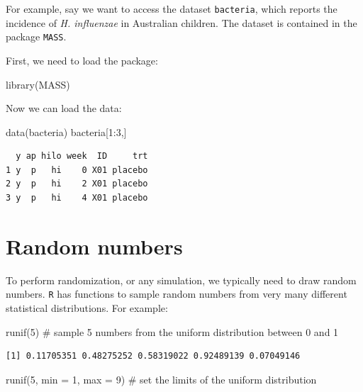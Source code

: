 \documentclass[
  letterpaper,
  DIV=11,
  numbers=noendperiod]{scrreprt}
\newenvironment{Shaded}{\begin{snugshade}}{\end{snugshade}}
\newcommand{\AttributeTok}[1]{\textcolor[rgb]{0.40,0.45,0.13}{#1}}
\newcommand{\CommentTok}[1]{\textcolor[rgb]{0.37,0.37,0.37}{#1}}
\newcommand{\DecValTok}[1]{\textcolor[rgb]{0.68,0.00,0.00}{#1}}
\newcommand{\FunctionTok}[1]{\textcolor[rgb]{0.28,0.35,0.67}{#1}}
\newcommand{\NormalTok}[1]{\textcolor[rgb]{0.00,0.23,0.31}{#1}}
\newcommand{\SpecialCharTok}[1]{\textcolor[rgb]{0.37,0.37,0.37}{#1}}
\begin{document}
For example, say we want to access the dataset \texttt{bacteria}, which
reports the incidence of \emph{H. influenzae} in Australian children.
The dataset is contained in the package \texttt{MASS}.

First, we need to load the package:

\begin{Shaded}
\begin{Highlighting}[]
\FunctionTok{library}\NormalTok{(MASS)}
\end{Highlighting}
\end{Shaded}

Now we can load the data:

\begin{Shaded}
\begin{Highlighting}[]
\FunctionTok{data}\NormalTok{(bacteria)}
\NormalTok{bacteria[}\DecValTok{1}\SpecialCharTok{:}\DecValTok{3}\NormalTok{,]}
\end{Highlighting}
\end{Shaded}

\begin{verbatim}
  y ap hilo week  ID     trt
1 y  p   hi    0 X01 placebo
2 y  p   hi    2 X01 placebo
3 y  p   hi    4 X01 placebo
\end{verbatim}

\hypertarget{random-numbers}{%
\section{Random numbers}\label{random-numbers}}

To perform randomization, or any simulation, we typically need to draw
random numbers. \texttt{R} has functions to sample random numbers from
very many different statistical distributions. For example:

\begin{Shaded}
\begin{Highlighting}[]
\FunctionTok{runif}\NormalTok{(}\DecValTok{5}\NormalTok{) }\CommentTok{\# sample 5 numbers from the uniform distribution between 0 and 1}
\end{Highlighting}
\end{Shaded}

\begin{verbatim}
[1] 0.11705351 0.48275252 0.58319022 0.92489139 0.07049146
\end{verbatim}

\begin{Shaded}
\begin{Highlighting}[]
\FunctionTok{runif}\NormalTok{(}\DecValTok{5}\NormalTok{, }\AttributeTok{min =} \DecValTok{1}\NormalTok{, }\AttributeTok{max =} \DecValTok{9}\NormalTok{) }\CommentTok{\# set the limits of the uniform distribution}
\end{Highlighting}
\end{Shaded}
\end{document}
